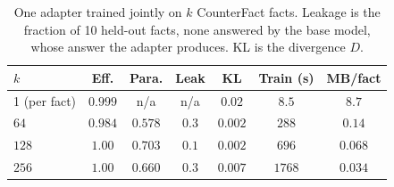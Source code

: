 \begin{table}[t]
\centering
\caption{One adapter trained jointly on $k$ CounterFact facts. Leakage is the
fraction of 10 held-out facts, none answered by the base model, whose answer the
adapter produces. KL is the divergence $D$.}
\label{tab:capacity}
\footnotesize
\setlength{\tabcolsep}{4pt}
\begin{tabular}{lcccccc}
\toprule
$k$ & Eff. & Para. & Leak & KL & Train (s) & MB/fact \\
\midrule
1 (per fact) & $0.999$ & n/a & n/a & $0.02$ & $8.5$ & $8.7$ \\
$64$ & $0.984$ & $0.578$ & $0.3$ & $0.002$ & $288$ & $0.14$ \\
$128$ & $1.00$ & $0.703$ & $0.1$ & $0.002$ & $696$ & $0.068$ \\
$256$ & $1.00$ & $0.660$ & $0.3$ & $0.007$ & $1768$ & $0.034$ \\
\bottomrule
\end{tabular}
\end{table}
